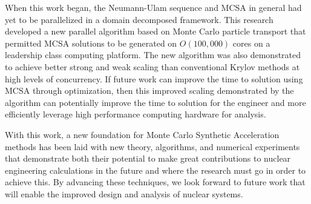 When this work began, the Neumann-Ulam sequence and MCSA in general
had yet to be parallelized in a domain decomposed framework. This
research developed a new parallel algorithm based on Monte Carlo
particle transport that permitted MCSA solutions to be generated on
$O(100,000)$ cores on a leadership class computing platform. The new
algorithm was also demonstrated to achieve better strong and weak
scaling than conventional Krylov methods at high levels of
concurrency. If future work can improve the time to solution using
MCSA through optimization, then this improved scaling demonstrated by
the algorithm can potentially improve the time to solution for the
engineer and more efficiently leverage high performance computing
hardware for analysis.

With this work, a new foundation for Monte Carlo Synthetic Acceleration
methods has been laid with new theory, algorithms, and numerical
experiments that demonstrate both their potential to make great
contributions to nuclear engineering calculations in the future and
where the research must go in order to achieve this. By advancing
these techniques, we look forward to future work that will enable the
improved design and analysis of nuclear systems.
